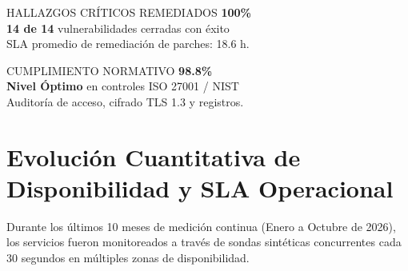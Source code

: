 \documentclass[11pt,letterpaper]{article}
\begin{document}
\noindent
\begin{minipage}[t]{0.485\textwidth}
  \begin{corpmetric}{HALLAZGOS CR\'ITICOS REMEDIADOS}
    {\fontsize{18}{20}\selectfont\bfseries\color{corpPrimary} 100\%}\\[2pt]
    {\footnotesize\color{corpSuccess}\textbf{14 de 14} vulnerabilidades cerradas con \'exito}\\[1pt]
    {\scriptsize\color{corpTextMuted}SLA promedio de remediaci\'on de parches: 18.6 h.}
  \end{corpmetric}
\end{minipage}\hfill
\begin{minipage}[t]{0.485\textwidth}
  \begin{corpmetric}{CUMPLIMIENTO NORMATIVO}
    {\fontsize{18}{20}\selectfont\bfseries\color{corpPrimary} 98.8\%}\\[2pt]
    {\footnotesize\color{corpSuccess}\textbf{Nivel \'Optimo} en controles ISO 27001 / NIST}\\[1pt]
    {\scriptsize\color{corpTextMuted}Auditor\'ia de acceso, cifrado TLS 1.3 y registros.}
  \end{corpmetric}
\end{minipage}

\vspace{0.5em}

\section{Evoluci\'on Cuantitativa de Disponibilidad y SLA Operacional}

Durante los \'ultimos 10 meses de medici\'on continua (Enero a Octubre de 2026), los servicios fueron monitoreados a trav\'es de sondas sint\'eticas concurrentes cada 30 segundos en m\'ultiples zonas de disponibilidad.

\vspace{0.3em}
\end{document}
